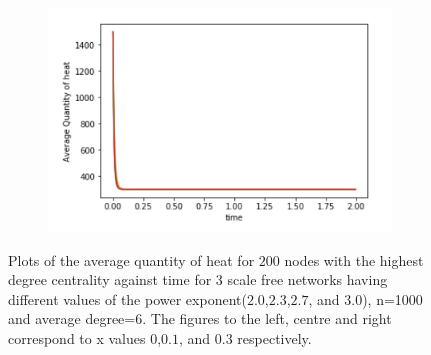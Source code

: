 \documentclass[10pt,a4paper]{article}
\begin{document}
\begin{figure}[!h]
\begin{subfigure}[b]{0.30\textwidth}
		\includegraphics[width= \textwidth]{images/quantity-time-exponents-x03.png}
	\end{subfigure}
	\caption{Plots of the average quantity of heat for $200$ nodes with the highest degree centrality against time for $3$ scale free networks having different values of the power exponent($2.0$,$2.3$,$2.7$, and $3.0$), n=1000 and average degree=$6$. The figures to the left, centre and right correspond to x values $0$,$0.1$, and $0.3$ respectively.}
	\label{gridatx01}
\end{figure}
\end{document}
